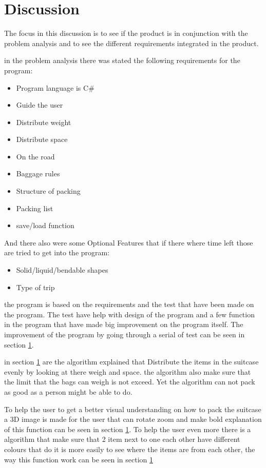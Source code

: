 \section{Discussion}
The focus in this discussion is to see if the product is in conjunction with the problem analysis and to see the different requirements integrated in the product.

in the problem analysis there was stated the following requirements for the program:

\begin{itemize}
\item Program language is C\#
\item Guide the user
\item Distribute weight
\item Distribute space
\item On the road
\item Baggage rules
\item Structure of packing
\item Packing list
\item save/load function
\end{itemize}

And there also were some Optional Features that if there where time left those are tried to get into the program:
\begin{itemize}
\item Solid/liquid/bendable shapes
\item Type of trip
\end{itemize}

the program is based on the requirements and the test that have been made on the program. The test have help with design of the program and a few function in the program that have made big improvement on the program itself. The improvement of the program by going through a serial of test can be seen in section \ref{}.

in section \ref{} are the algorithm explained that Distribute the items in the suitcase evenly by looking at there weigh and space. the algorithm also make sure that the limit that the bags can weigh is not exceed. Yet the algorithm can not pack as good as a person might be able to do.

To help the user to get a better visual understanding on how to pack the suitcase a 3D image is made for the user that can rotate zoom and make bold explanation of this function can be seen in section \ref{}. To help the user even more there is a algorithm that make sure that 2 item next to one each other have different colours that do it is more easily to see where the items are from each other, the way this function work can be seen in section \ref{} 

